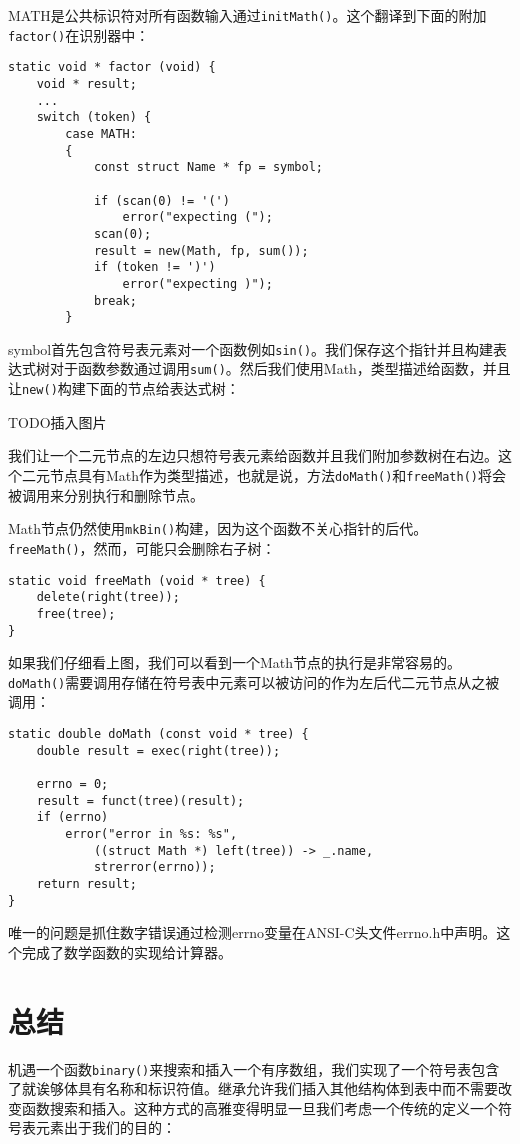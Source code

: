 MATH是公共标识符对所有函数输入通过\verb|initMath()|。这个翻译到下面的附加\verb|factor()|在识别器中：

\begin{lstlisting}
static void * factor (void) {
	void * result;
	...
	switch (token) {
		case MATH:
		{
			const struct Name * fp = symbol;

			if (scan(0) != '(')
				error("expecting (");
			scan(0);
			result = new(Math, fp, sum());
			if (token != ')')
				error("expecting )");
			break;
		}
\end{lstlisting}
symbol首先包含符号表元素对一个函数例如\verb|sin()|。我们保存这个指针并且构建表达式树对于函数参数通过调用\verb|sum()|。然后我们使用Math，类型描述给函数，并且让\verb|new()|构建下面的节点给表达式树：

TODO插入图片

我们让一个二元节点的左边只想符号表元素给函数并且我们附加参数树在右边。这个二元节点具有Math作为类型描述，也就是说，方法\verb|doMath()|和\verb|freeMath()|将会被调用来分别执行和删除节点。

Math节点仍然使用\verb|mkBin()|构建，因为这个函数不关心指针的后代。\verb|freeMath()|，然而，可能只会删除右子树：

\begin{lstlisting}
static void freeMath (void * tree) {
	delete(right(tree));
	free(tree);
}
\end{lstlisting}
如果我们仔细看上图，我们可以看到一个Math节点的执行是非常容易的。\verb|doMath()|需要调用存储在符号表中元素可以被访问的作为左后代二元节点从之被调用：

\begin{lstlisting}
static double doMath (const void * tree) {
	double result = exec(right(tree));

	errno = 0;
	result = funct(tree)(result);
	if (errno)
		error("error in %s: %s",
			((struct Math *) left(tree)) -> _.name,
			strerror(errno));
	return result;
}
\end{lstlisting}

唯一的问题是抓住数字错误通过检测errno变量在ANSI-C头文件errno.h中声明。这个完成了数学函数的实现给计算器。

\section{总结}

机遇一个函数\verb|binary()|来搜索和插入一个有序数组，我们实现了一个符号表包含了就诶够体具有名称和标识符值。继承允许我们插入其他结构体到表中而不需要改变函数搜索和插入。这种方式的高雅变得明显一旦我们考虑一个传统的定义一个符号表元素出于我们的目的：

